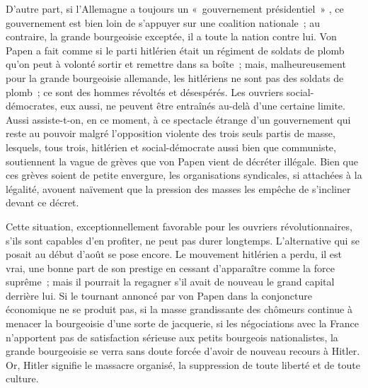 \documentclass[french,twoside]{book} %
\begin{document}
D'autre part, si l'Allemagne a toujours un « gouvernement présidentiel » , ce gouvernement est bien loin de s'appuyer sur une coalition nationale ; au contraire, la grande bourgeoisie exceptée, il a toute la nation contre lui. Von Papen a fait comme si le parti hitlérien était un régiment de soldats de plomb qu'on peut à volonté sortir et remettre dans sa boîte ; mais, malheureusement pour la grande bourgeoisie allemande, les hitlériens ne sont pas des soldats de plomb ; ce sont des hommes révoltés et désespérés. Les ouvriers social-démocrates, eux aussi, ne peuvent être entraînés au-delà d'une certaine limite. Aussi assiste-t-on, en ce moment, à ce spectacle étrange d'un gouvernement qui reste au pouvoir malgré l'opposition violente des trois seuls partis de masse, lesquels, tous trois, hitlérien et social-démocrate aussi bien que com­muniste, soutiennent la vague de grèves que von Papen vient de décréter illégale. Bien que ces grèves soient de petite envergure, les organisations syndicales, si attachées à la légalité, avouent naïvement que la pression des masses les empêche de s'incliner devant ce décret.\par
Cette situation, exceptionnellement favorable pour les ouvriers révolution­naires, s'ils sont capables d'en profiter, ne peut pas durer longtemps. L'alter­native qui se posait au début d'août se pose encore. Le mouvement hitlérien a perdu, il est vrai, une bonne part de son prestige en cessant d'apparaître comme la force suprême ; mais il pourrait la regagner s'il avait de nouveau le grand capital derrière lui. Si le tournant annoncé par von Papen dans la conjoncture économique ne se produit pas, si la masse grandissante des chô­meurs continue à menacer la bourgeoisie d'une sorte de jacquerie, si les négociations avec la France n'apportent pas de satisfaction sérieuse aux petits bourgeois nationalistes, la grande bourgeoisie se verra sans doute forcée d'avoir de nouveau recours à Hitler. Or, Hitler signifie le massacre organisé, la suppression de toute liberté et de toute culture.\par
\end{document}

